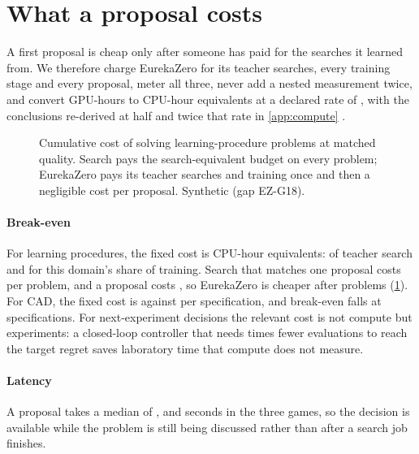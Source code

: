 \section{What a proposal costs}
\label{sec:compute}

A first proposal is cheap only after someone has paid for the searches it learned from. We therefore
charge EurekaZero for its teacher searches, every training stage and every proposal, meter all
three, never add a nested measurement twice, and convert GPU-hours to CPU-hour equivalents at a
declared rate of \syn[EZ-G18]{\EZgpuRate}, with the conclusions re-derived at half and twice that
rate in \cref{app:compute} \synbadge.

\begin{figure}[t]
\centering

\caption{Cumulative cost of solving learning-procedure problems at matched quality. Search pays
the search-equivalent budget on every problem; EurekaZero pays its teacher searches and training
once and then a negligible cost per proposal. Synthetic (gap EZ-G18).}
\label{fig:cost}
\end{figure}

\paragraph{Break-even} For learning procedures, the fixed cost is \syn[EZ-G18]{\EZfixA} CPU-hour
equivalents: \syn[EZ-G18]{\EZteachA} of teacher search and \syn[EZ-G18]{\EZshareA} for this domain's
share of training. Search that matches one proposal costs \syn[EZ-G18]{\EZsearchPerA} per problem,
and a proposal costs \syn[EZ-G18]{\EZmarginA}, so EurekaZero is cheaper after
\syn[EZ-G18]{\EZbreakA} problems (\cref{fig:cost}). For CAD, the fixed cost is
\syn[EZ-G18]{\EZfixC} against \syn[EZ-G18]{\EZsearchPerC} per specification, and break-even falls at
\syn[EZ-G18]{\EZbreakC} specifications. For next-experiment decisions the relevant cost is not
compute but experiments: a closed-loop controller that needs \syn[EZ-G04]{\EZsaveB} times fewer
evaluations to reach the target regret saves laboratory time that compute does not measure.

\paragraph{Latency} A proposal takes a median of \syn[EZ-G18]{\EZlatA}, \syn[EZ-G18]{\EZlatB} and
\syn[EZ-G18]{\EZlatC} seconds in the three games, so the decision is available while the problem is
still being discussed rather than after a search job finishes.


